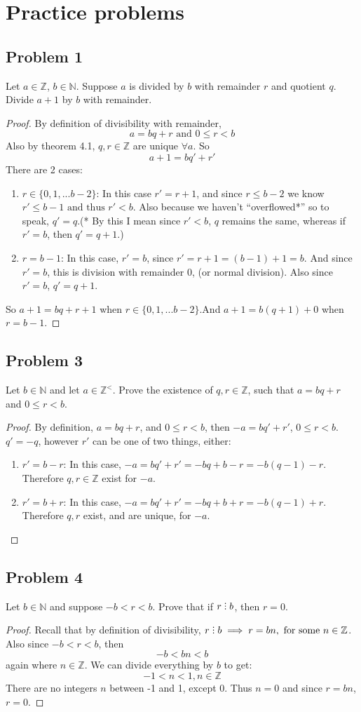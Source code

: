 \documentclass[12pt]{article}
\title{\scalebox{2}{Math 341 Homework 4}}
\author{\scalebox{1.5}{Theo Koss}}
\date{September 2020}
\newcommand{\N}{\mathbb{N}}
\newcommand{\Z}{\mathbb{Z}}
\newcommand{\divby}{%
  \mathrel{\text{\vbox{\baselineskip.65ex\lineskiplimit0pt\hbox{.}\hbox{.}\hbox{.}}}}%
  }
\begin{document}
\maketitle
\section{Practice problems}
\subsection{Problem 1}
Let $a\in\Z$, $b\in\N$. Suppose $a$ is divided by $b$ with remainder $r$ and quotient $q$. Divide $a+1$ by $b$ with remainder. \begin{proof}
By definition of divisibility with remainder, $$a=bq+r \text{ and } 0\leq r<b$$Also by theorem 4.1, $q,r\in\Z$ are unique $\forall a$. So $$a+1=bq'+r'$$There are 2 cases:\begin{enumerate}
    \item $r\in\{0,1,...b-2\}$: In this case $r'=r+1$, and since $r\leq b-2$ we know $r'\leq b-1\text{ and thus }r'<b$. Also because we haven't ``overflowed*'' so to speak, $q'=q$.\newline(* By this I mean since $r'<b$, $q$ remains the same, whereas if $r'=b$, then $q'=q+1$.)
    \item $r=b-1$: In this case, $r'=b$, since $r'=r+1=(b-1)+1=b$. And since $r'=b$, this is division with remainder 0, (or normal division). Also since $r'=b$, $q'=q+1$.
\end{enumerate}
So $a+1=bq+r+1$ when $r\in\{0,1,...b-2\}$.\newline And $a+1=b(q+1)+0$ when $r=b-1$.
\end{proof}
\subsection{Problem 3}
Let $b\in\N$ and let $a\in\Z^<$. Prove the existence of $q,r\in\Z$, such that $a=bq+r$ and $0\leq r<b$.
\begin{proof}
By definition, $a=bq+r$, and $0\leq r<b$, then $-a=bq'+r'$, $0\leq r<b$. $q'=-q$, however $r'$ can be one of two things, either:\begin{enumerate}
    \item $r'=b-r$: In this case, $-a=bq'+r'=-bq+b-r=-b(q-1)-r$. Therefore $q,r\in\Z$ exist for $-a$.
    \item $r'=b+r$: In this case, $-a=bq'+r'=-bq+b+r=-b(q-1)+r$. Therefore $q,r$ exist, and are unique, for $-a$.
\end{enumerate}
\end{proof}
\subsection{Problem 4}
Let $b\in\N$ and suppose $-b<r<b$. Prove that if $r\divby b$, then $r=0$.
\begin{proof}
Recall that by definition of divisibility, $r\divby b\implies r=bn,\text{ for some }n\in\Z$. Also since $-b<r<b$, then $$-b<bn<b$$ again where $n\in\Z$. We can divide everything by $b$ to get:$$-1<n<1, n\in\Z$$There are no integers $n$ between -1 and 1, except 0. Thus $n=0$ and since $r=bn$, $r=0$.
\end{proof}
\end{document}
